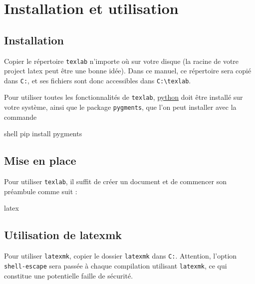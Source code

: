
\section{Installation et utilisation}
    \subsection{Installation}
        Copier le répertoire \verb|texlab| n'importe où sur votre disque (la racine de votre project latex peut être une bonne idée). Dans ce manuel, ce répertoire sera copié dans \verb|C:|, et ses fichiers sont donc accessibles dans \verb|C:\texlab|.

        Pour utiliser toutes les fonctionnalités de \verb|texlab|, \href{https://www.python.org/}{python} doit être installé sur votre système, ainsi que le package \verb|pygments|, que l'on peut installer avec la commande
        \begin{code}{shell}
             pip install pygments
        \end{code} 

    \subsection{Mise en place}
        Pour utiliser \verb|texlab|, il suffit de créer un document et de commencer son préambule comme suit :
        \begin{code}{latex}
            \newcommand{\templatesroot}{C:/texlab}
            
        \end{code}

    \subsection{Utilisation de latexmk}
        Pour utiliser \verb|latexmk|, copier le dossier \verb|latexmk| dans \verb|C:|. Attention, l'option \verb|shell-escape| sera passée à chaque compilation utilisant \verb|latexmk|, ce qui constitue une potentielle faille de sécurité.